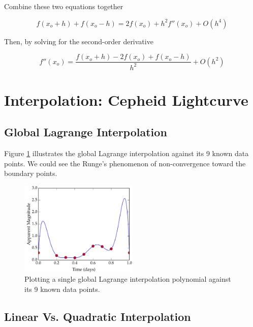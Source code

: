 \documentclass[11pt,letterpaper]{article}
\begin{document}
Combine these two equations together

	\begin{equation}
	f(x_o+h)+f(x_o-h) = 2f(x_o) + h^2 f''(x_o) + O(h^4) \nonumber
	\end{equation}

Then, by solving for the second-order derivative

	\begin{equation}
	f''(x_o) = \frac{f(x_o+h)-2f(x_o)+f(x_o-h)}{h^2} + O(h^2) \nonumber
	\end{equation}


\section{Interpolation: Cepheid Lightcurve}

\subsection{Global Lagrange Interpolation}

Figure \ref{fig:GlobalLagrange} illustrates the global Lagrange interpolation against its 9 known data points.
We could see the Runge's phenomenon of non-convergence toward the boundary points.

\begin{figure}[h!]
	\centering
	\includegraphics[width=0.5\textwidth]{GlobalLagrange}
	\caption{Plotting a single global Lagrange interpolation polynomial against its 9 known data points.}
	\label{fig:GlobalLagrange}
\end{figure}

\subsection{Linear Vs. Quadratic Interpolation}
\end{document}
